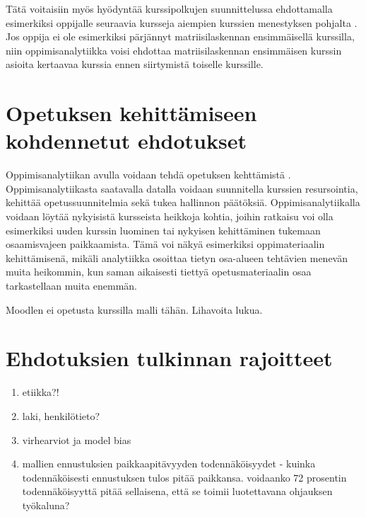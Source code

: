 Tätä voitaisiin myös hyödyntää kurssipolkujen suunnittelussa ehdottamalla esimerkiksi oppijalle seuraavia kursseja aiempien kurssien menestyksen pohjalta \citep{longPenetratingFogAnalytics2011}. Jos oppija ei ole esimerkiksi pärjännyt matriisilaskennan ensimmäisellä kurssilla, niin oppimisanalytiikka voisi ehdottaa matriisilaskennan ensimmäisen kurssin asioita kertaavaa kurssia ennen siirtymistä toiselle kurssille.

\section{Opetuksen kehittämiseen kohdennetut ehdotukset}

Oppimisanalytiikan avulla voidaan tehdä opetuksen kehttämistä \citep{romeroEducationalDataMining2010}. Oppimisanalytiikasta saatavalla datalla voidaan suunnitella kurssien resursointia, kehittää opetussuunnitelmia sekä tukea hallinnon päätöksiä. Oppimisanalytiikalla voidaan löytää nykyisistä kursseista heikkoja kohtia, joihin ratkaisu voi olla esimerkiksi uuden kurssin luominen tai nykyisen kehittäminen tukemaan osaamisvajeen paikkaamista. Tämä voi näkyä esimerkiksi oppimateriaalin kehittämisenä, mikäli analytiikka osoittaa tietyn osa-alueen tehtävien menevän muita heikommin, kun saman aikaisesti tiettyä opetusmateriaalin osaa tarkastellaan muita enemmän.

\color{red} Moodlen ei opetusta kurssilla malli tähän. Lihavoita lukua. \color{black}

\color{red}
\section{Ehdotuksien tulkinnan rajoitteet}

\begin{enumerate}
    \item etiikka?! \citep{kailaEthicalConsiderationsLearning2019}
    \item laki, henkilötieto? \citep{hannulaOppijanDigitaalinenJalanjalki2017}
    \item virhearviot ja model bias
    \item mallien ennustuksien paikkaapitävyyden todennäköisyydet - kuinka todennäköisesti ennustuksen tulos pitää paikkansa. voidaanko 72 prosentin todennäköisyyttä pitää sellaisena, että se toimii luotettavana ohjauksen työkaluna?
\end{enumerate}